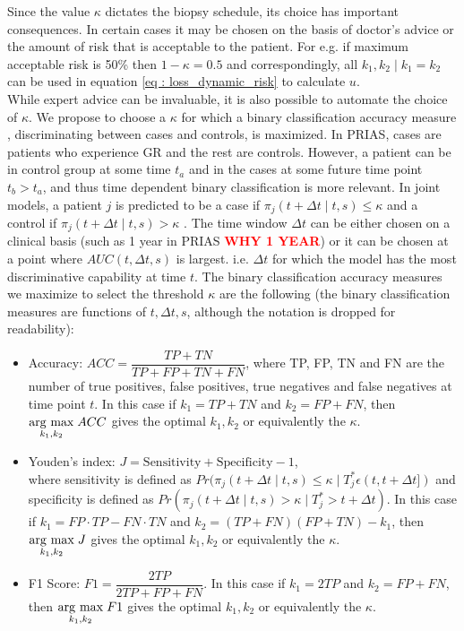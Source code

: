Since the value $\kappa$ dictates the biopsy schedule, its choice has important consequences. In certain cases it may be chosen on the basis of doctor's advice or the amount of risk that is acceptable to the patient. For e.g. if maximum acceptable risk is 50\% then $1 - \kappa = 0.5$ and correspondingly, all $k_1, k_2 \mid k_1=k_2$ can be used in equation \ref{eq : loss_dynamic_risk} to calculate $u$. \\

While expert advice can be invaluable, it is also possible to automate the choice of $\kappa$. We propose to choose a $\kappa$ for which a binary classification accuracy measure \citep{lopez2014optimalcutpoints,sokolova2009systematic}, discriminating between cases and controls, is maximized. In PRIAS, cases are patients who experience GR and the rest are controls. However, a patient can be in control group at some time $t_a$ and in the cases at some future time point $t_b > t_a$, and thus time dependent binary classification is more relevant. In joint models, a patient $j$ is predicted to be a case if $\pi_j(t + \Delta t \mid t,s) \leq \kappa$ and a control if $\pi_j(t + \Delta t \mid t,s) > \kappa$ \citep{rizopoulosJMbayes}. The time window $\Delta t$ can be either chosen on a clinical basis (such as 1 year in PRIAS \textcolor{red}{\textbf{WHY 1 YEAR}}) or it can be chosen at a point where $AUC(t, \Delta t, s)$ \citep{rizopoulosJMbayes} is largest. i.e. $\Delta t$ for which the model has the most discriminative capability at time $t$. The binary classification accuracy measures we maximize to select the threshold $\kappa$ are the following (the binary classification measures are functions of $t, \Delta t, s$, although the notation is dropped for readability): 

\begin{itemize}
\item Accuracy: $ACC = \dfrac{TP + TN}{TP + FP + TN + FN}$, where TP, FP, TN and FN are the number of true positives, false positives, true negatives and false negatives at time point $t$. In this case if $k_1 = TP + TN$ and $k_2 = FP + FN$, then $\underset{k_1, k_2}{\operatorname{arg}\,\operatorname{max}}\; ACC$ gives the optimal $k_1, k_2$ or equivalently the $\kappa$.

\item Youden's index: $J = \text{Sensitivity} + \text{Specificity}- 1$,\\
where sensitivity is defined as $Pr(\pi_j(t + \Delta t \mid t,s) \leq \kappa \mid T^*_j \epsilon (t, t + \Delta t])$ and specificity is defined as $Pr(\pi_j(t + \Delta t \mid t,s) > \kappa \mid T^*_j > t + \Delta t)$. In this case if $k_1 = FP \cdot TP - FN \cdot TN$ and $k_2 = (TP+FN)(FP+TN) - k_1$, then $\underset{k_1, k_2}{\operatorname{arg}\,\operatorname{max}}\; J$ gives the optimal $k_1, k_2$ or equivalently the $\kappa$.

\item F1 Score: $F1 = \dfrac{2TP}{2TP + FP + FN}$. In this case if $k_1 = 2TP$ and $k_2 = FP + FN$, then $\underset{k_1, k_2}{\operatorname{arg}\,\operatorname{max}}\; F1$ gives the optimal $k_1, k_2$ or equivalently the $\kappa$.
\end{itemize}

